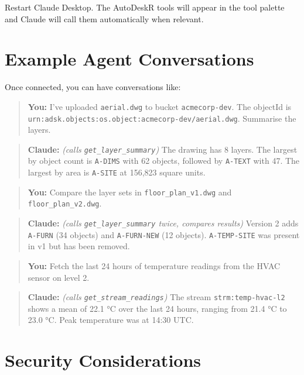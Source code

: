 \documentclass[
  11pt,
  letterpaper,
  DIV=11,
  numbers=noendperiod]{scrreprt}
\begin{document}
Restart Claude Desktop. The AutoDeskR tools will appear in the tool
palette and Claude will call them automatically when relevant.

\section{Example Agent Conversations}\label{example-agent-conversations}

Once connected, you can have conversations like:

\begin{quote}
\textbf{You:} I've uploaded \texttt{aerial.dwg} to bucket
\texttt{acmecorp-dev}. The objectId is
\texttt{urn:adsk.objects:os.object:acmecorp-dev/aerial.dwg}. Summarise
the layers.
\end{quote}

\begin{quote}
\textbf{Claude:} \emph{(calls \texttt{get\_layer\_summary})} The drawing
has 8 layers. The largest by object count is \texttt{A-DIMS} with 62
objects, followed by \texttt{A-TEXT} with 47. The largest by area is
\texttt{A-SITE} at 156,823 square units.
\end{quote}

\begin{quote}
\textbf{You:} Compare the layer sets in \texttt{floor\_plan\_v1.dwg} and
\texttt{floor\_plan\_v2.dwg}.
\end{quote}

\begin{quote}
\textbf{Claude:} \emph{(calls \texttt{get\_layer\_summary} twice,
compares results)} Version 2 adds \texttt{A-FURN} (34 objects) and
\texttt{A-FURN-NEW} (12 objects). \texttt{A-TEMP-SITE} was present in v1
but has been removed.
\end{quote}

\begin{quote}
\textbf{You:} Fetch the last 24 hours of temperature readings from the
HVAC sensor on level 2.
\end{quote}

\begin{quote}
\textbf{Claude:} \emph{(calls \texttt{get\_stream\_readings})} The
stream \texttt{strm:temp-hvac-l2} shows a mean of 22.1 °C over the last
24 hours, ranging from 21.4 °C to 23.0 °C. Peak temperature was at 14:30
UTC.
\end{quote}

\section{Security Considerations}\label{security-considerations}
\end{document}

